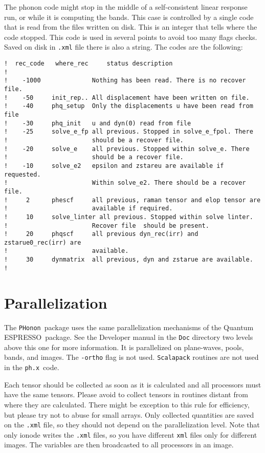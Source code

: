 \documentclass[12pt,a4paper]{article}
\def\qe{{\sc Quantum ESPRESSO}}
\def\phx{\texttt{ph.x}}
\def\PHonon{\texttt{PHonon}}
\begin{document}
The phonon code might stop in the middle of a self-consistent linear response 
run, or while it is computing the bands. This case is controlled  
by a single code that is read from the files written on disk.
This is an integer that tells where the code stopped. This code
is used in several points to avoid too many flags checks. Saved
on disk in \texttt{.xml} file there is also a string.  
The codes are the following:
\newpage

\begin{verbatim}
!  rec_code   where_rec     status description
!
!    -1000              Nothing has been read. There is no recover file.
!    -50     init_rep.. All displacement have been written on file.
!    -40     phq_setup  Only the displacements u have been read from file
!    -30     phq_init   u and dyn(0) read from file
!    -25     solve_e_fp all previous. Stopped in solve_e_fpol. There
!                       should be a recover file.
!    -20     solve_e    all previous. Stopped within solve_e. There 
!                       should be a recover file.
!    -10     solve_e2   epsilon and zstareu are available if requested. 
!                       Within solve_e2. There should be a recover file.
!     2      phescf     all previous, raman tensor and elop tensor are
!                       available if required.
!     10     solve_linter all previous. Stopped within solve linter. 
!                       Recover file  should be present.
!     20     phqscf     all previous dyn_rec(irr) and zstarue0_rec(irr) are
!                       available.
!     30     dynmatrix  all previous, dyn and zstarue are available.
! 
\end{verbatim}


\section{Parallelization}

The \PHonon\ package uses the same parallelization mechanisms of the \qe\
package. See the Developer manual in the \texttt{Doc} directory
two levels above this one for more information.
It is parallelized on plane-waves, pools, bands, and images.
The \texttt{-ortho} flag is not used. \texttt{Scalapack} routines are not 
used in the \phx\ code.

Each tensor should be collected as soon as it is calculated
and all processors must have the same tensors. Please avoid to collect
tensors in routines distant from where they are calculated. There might be
exception to this rule for efficiency, but please try not to abuse for
small arrays. Only collected quantities are saved on the \texttt{.xml} file,
so they should not depend on the parallelization level. Note that only ionode
writes the \texttt{.xml} files, so you have different \texttt{xml} files only 
for different images. The variables are then broadcasted to all processors 
in an image.
\end{document}
